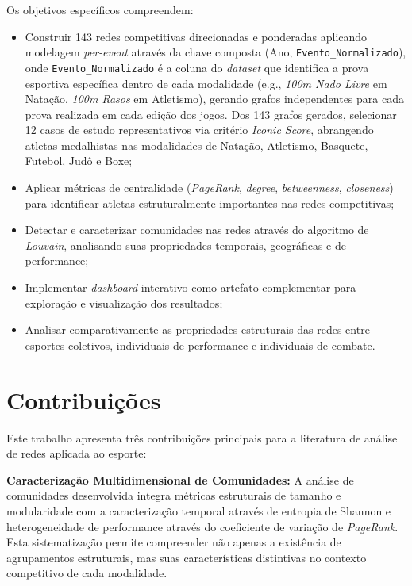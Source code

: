 Os objetivos específicos compreendem:

\begin{itemize}
    \item Construir 143 redes competitivas direcionadas e ponderadas aplicando modelagem \textit{per-event} através da chave composta (Ano, \texttt{Evento\_Normalizado}), onde \texttt{Evento\_Normalizado} é a coluna do \textit{dataset} que identifica a prova esportiva específica dentro de cada modalidade (e.g., \textit{100m Nado Livre} em Natação, \textit{100m Rasos} em Atletismo), gerando grafos independentes para cada prova realizada em cada edição dos jogos. Dos 143 grafos gerados, selecionar 12 casos de estudo representativos via critério \textit{Iconic Score}{}, abrangendo atletas medalhistas nas modalidades de Natação, Atletismo, Basquete, Futebol, Judô e Boxe;
    \item Aplicar métricas de centralidade (\textit{PageRank}{}, \textit{degree}, \textit{betweenness}{}, \textit{closeness}{}) para identificar atletas estruturalmente importantes nas redes competitivas;
    \item Detectar e caracterizar comunidades nas redes através do algoritmo de \textit{Louvain}{}, analisando suas propriedades temporais, geográficas e de performance;
    \item Implementar \textit{dashboard} interativo como artefato complementar para exploração e visualização dos resultados;
    \item Analisar comparativamente as propriedades estruturais das redes entre esportes coletivos, individuais de performance e individuais de combate.
\end{itemize}

\section{Contribuições}

Este trabalho apresenta três contribuições principais para a literatura de análise de redes aplicada ao esporte:

\textbf{Caracterização Multidimensional de Comunidades:} A análise de comunidades desenvolvida integra métricas estruturais de tamanho e modularidade com a caracterização temporal através de entropia de Shannon e heterogeneidade de performance através do coeficiente de variação de \textit{PageRank}{}. Esta sistematização permite compreender não apenas a existência de agrupamentos estruturais, mas suas características distintivas no contexto competitivo de cada modalidade.

